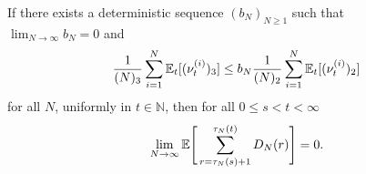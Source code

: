 


\begin{lemma} \label{lem:removeass2}
If there exists a deterministic sequence $(b_N)_{N\geq1}$ such that\\ ${\lim}_{N\to\infty} b_N =0$ and
\begin{equation*}
\frac{1}{(N)_3} \sum_{i = 1}^N \mathbb{E}_t[ (\nu_t^{(i)})_3 ]  \leq b_N \frac{1}{(N)_2} \sum_{i = 1}^N \mathbb{E}_t[ (\nu_t^{(i)})_2 ]
\end{equation*}
for all $N$, uniformly in $t \in \mathbb{N}$,
then for all $0 \leq s < t < \infty$
\begin{equation*}
\lim_{ N \rightarrow \infty } \mathbb{E}\Bigg[ \sum_{ r = \tau_N( s ) + 1 }^{ \tau_N( t ) } D_N( r ) \Bigg] = 0 .
\end{equation*}
\end{lemma}

